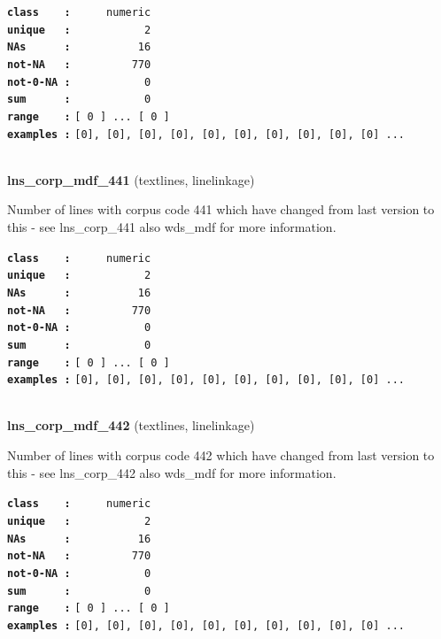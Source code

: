 \documentclass[]{article}
\begin{document}
\textbf{\texttt{class\ \ \ \ :}} \texttt{~~~~~numeric}\\
\textbf{\texttt{unique\ \ \ :}} \texttt{~~~~~~~~~~~2}\\
\textbf{\texttt{NAs\ \ \ \ \ \ :}} \texttt{~~~~~~~~~~16}\\
\textbf{\texttt{not-NA\ \ \ :}} \texttt{~~~~~~~~~770}\\
\textbf{\texttt{not-0-NA\ :}} \texttt{~~~~~~~~~~~0}\\
\textbf{\texttt{sum\ \ \ \ \ \ :}} \texttt{~~~~~~~~~~~0}\\
\textbf{\texttt{range\ \ \ \ :}}
\texttt{{[}\ 0\ {]}\ ...\ {[}\ 0\ {]}}\\
\textbf{\texttt{examples\ :}}
\texttt{{[}0{]},\ {[}0{]},\ {[}0{]},\ {[}0{]},\ {[}0{]},\ {[}0{]},\ {[}0{]},\ {[}0{]},\ {[}0{]},\ {[}0{]}\ ...}\\

~

\textbf{lns\_corp\_mdf\_441} (textlines, linelinkage)

Number of lines with corpus code 441 which have changed from last
version to this - see lns\_corp\_441 also wds\_mdf for more information.

\textbf{\texttt{class\ \ \ \ :}} \texttt{~~~~~numeric}\\
\textbf{\texttt{unique\ \ \ :}} \texttt{~~~~~~~~~~~2}\\
\textbf{\texttt{NAs\ \ \ \ \ \ :}} \texttt{~~~~~~~~~~16}\\
\textbf{\texttt{not-NA\ \ \ :}} \texttt{~~~~~~~~~770}\\
\textbf{\texttt{not-0-NA\ :}} \texttt{~~~~~~~~~~~0}\\
\textbf{\texttt{sum\ \ \ \ \ \ :}} \texttt{~~~~~~~~~~~0}\\
\textbf{\texttt{range\ \ \ \ :}}
\texttt{{[}\ 0\ {]}\ ...\ {[}\ 0\ {]}}\\
\textbf{\texttt{examples\ :}}
\texttt{{[}0{]},\ {[}0{]},\ {[}0{]},\ {[}0{]},\ {[}0{]},\ {[}0{]},\ {[}0{]},\ {[}0{]},\ {[}0{]},\ {[}0{]}\ ...}\\

~

\textbf{lns\_corp\_mdf\_442} (textlines, linelinkage)

Number of lines with corpus code 442 which have changed from last
version to this - see lns\_corp\_442 also wds\_mdf for more information.

\textbf{\texttt{class\ \ \ \ :}} \texttt{~~~~~numeric}\\
\textbf{\texttt{unique\ \ \ :}} \texttt{~~~~~~~~~~~2}\\
\textbf{\texttt{NAs\ \ \ \ \ \ :}} \texttt{~~~~~~~~~~16}\\
\textbf{\texttt{not-NA\ \ \ :}} \texttt{~~~~~~~~~770}\\
\textbf{\texttt{not-0-NA\ :}} \texttt{~~~~~~~~~~~0}\\
\textbf{\texttt{sum\ \ \ \ \ \ :}} \texttt{~~~~~~~~~~~0}\\
\textbf{\texttt{range\ \ \ \ :}}
\texttt{{[}\ 0\ {]}\ ...\ {[}\ 0\ {]}}\\
\textbf{\texttt{examples\ :}}
\texttt{{[}0{]},\ {[}0{]},\ {[}0{]},\ {[}0{]},\ {[}0{]},\ {[}0{]},\ {[}0{]},\ {[}0{]},\ {[}0{]},\ {[}0{]}\ ...}\\
\end{document}
